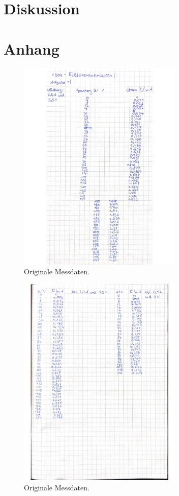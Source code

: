 \section{Diskussion}
\label{sec:Diskussion}


\printbibliography{}

\section*{Anhang}
\label{sec:anhang}

\begin{figure}[H]
    \centering
    \includegraphics[width=0.7\textwidth]{data/origDaten1.jpg}
    \caption{Originale Messdaten.}
    \label{fig:origDaten1}
\end{figure}

\begin{figure}[H]
    \centering
    \includegraphics[width=0.7\textwidth]{data/origDaten2.jpg}
    \caption{Originale Messdaten.}
    \label{fig:origDaten2}
\end{figure}

